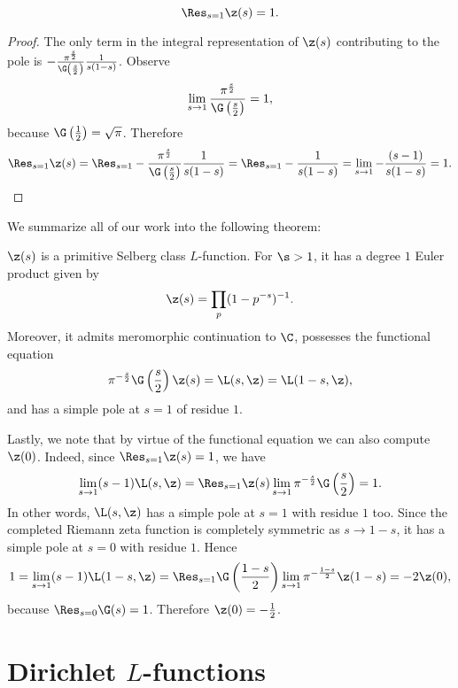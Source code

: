       \begin{proposition}\label{prop:zeta_residue}
        \[
          \Res_{s = 1}\z(s) = 1.
        \]
      \end{proposition}
      \begin{proof}
        The only term in the integral representation of $\z(s)$ contributing to the pole is $-\frac{\pi^{\frac{s}{2}}}{\G\left(\frac{s}{2}\right)}\frac{1}{s(1-s)}$. Observe
        \[
          \lim_{s \to 1}\frac{\pi^{\frac{s}{2}}}{\G\left(\frac{s}{2}\right)} = 1,
        \]
        because $\G\left(\frac{1}{2}\right) = \sqrt{\pi}$. Therefore
        \[
          \Res_{s = 1}\z(s) = \Res_{s = 1}-\frac{\pi^{\frac{s}{2}}}{\G\left(\frac{s}{2}\right)}\frac{1}{s(1-s)} = \Res_{s = 1}-\frac{1}{s(1-s)} = \lim_{s \to 1}-\frac{(s-1)}{s(1-s)} = 1.
        \]
      \end{proof}

      We summarize all of our work into the following theorem:

      \begin{theorem}\label{thm:zeta_Selberg}
        $\z(s)$ is a primitive Selberg class $L$-function. For $\s > 1$, it has a degree $1$ Euler product given by
        \[
          \z(s) = \prod_{p}(1-p^{-s})^{-1}.
        \]
        Moreover, it admits meromorphic continuation to $\C$, possesses the functional equation
        \[
          \pi^{-\frac{s}{2}}\G\left(\frac{s}{2}\right)\z(s) = \L(s,\z) = \L(1-s,\z),
        \]
        and has a simple pole at $s = 1$ of residue $1$.
      \end{theorem}

      Lastly, we note that by virtue of the functional equation we can also compute $\z(0)$. Indeed, since $\Res_{s = 1}\z(s) = 1$, we have
      \[
        \lim_{s \to 1}(s-1)\L(s,\z) = \Res_{s = 1}\z(s)\lim_{s \to 1}\pi^{-\frac{s}{2}}\G\left(\frac{s}{2}\right) = 1.
      \]
      In other words, $\L(s,\z)$ has a simple pole at $s = 1$ with residue $1$ too. Since the completed Riemann zeta function is completely symmetric as $s \to 1-s$, it has a simple pole at $s = 0$ with residue $1$. Hence
      \[
        1 = \lim_{s \to 1}(s-1)\L(1-s,\z) = \Res_{s = 1}\G\left(\frac{1-s}{2}\right)\lim_{s \to 1}\pi^{-\frac{1-s}{2}}\z(1-s) = -2\z(0),
      \]
      because $\Res_{s = 0}\G(s) = 1$. Therefore $\z(0) = -\frac{1}{2}$.
  \section{Dirichlet \texorpdfstring{$L$}{L}-functions}
